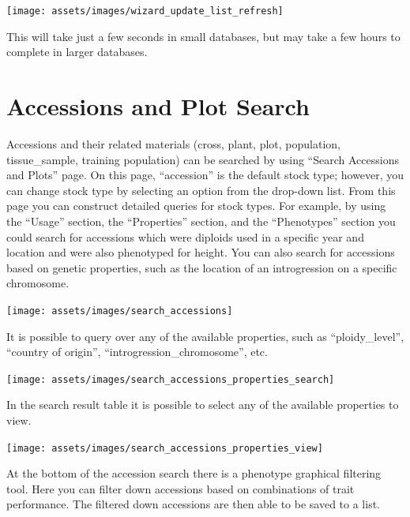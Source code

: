 \documentclass[
  12pt,
]{book}
\begin{document}
\begin{center}\texttt{[image: assets/images/wizard\_update\_list\_refresh]} \end{center}

This will take just a few seconds in small databases, but may take a few hours to complete in larger databases.

\hypertarget{accessions-and-plot-search}{%
\section{Accessions and Plot Search}\label{accessions-and-plot-search}}

Accessions and their related materials (cross, plant, plot, population, tissue\_sample, training population) can be searched by using ``Search Accessions and Plots'' page. On this page, ``accession'' is the default stock type; however, you can change stock type by selecting an option from the drop-down list. From this page you can construct detailed queries for stock types. For example, by using the ``Usage'' section, the ``Properties'' section, and the ``Phenotypes'' section you could search for accessions which were diploids used in a specific year and location and were also phenotyped for height. You can also search for accessions based on genetic properties, such as the location of an introgression on a specific chromosome.

\begin{center}\texttt{[image: assets/images/search\_accessions]} \end{center}

It is possible to query over any of the available properties, such as ``ploidy\_level'', ``country of origin'', ``introgression\_chromosome'', etc.

\begin{center}\texttt{[image: assets/images/search\_accessions\_properties\_search]} \end{center}

In the search result table it is possible to select any of the available properties to view.

\begin{center}\texttt{[image: assets/images/search\_accessions\_properties\_view]} \end{center}

At the bottom of the accession search there is a phenotype graphical filtering tool. Here you can filter down accessions based on combinations of trait performance. The filtered down accessions are then able to be saved to a list.
\end{document}
